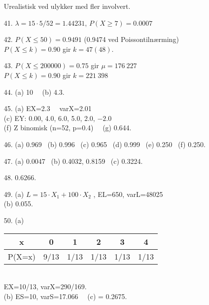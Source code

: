 \begin{itemize}
            Urealistisk ved ulykker med fler involvert. 
\item[41.]  $\lambda = 15\cdot 5/52=1.44231$, $P(X\geq 7)=0.0007$
\item[42.]  $P(X\leq 50)=0.9491$ (0.9474 ved Poissontilnærming)\\
            $P(X\leq k)=0.90$ gir $k=47(48)$.
\item[43.]  $P(X\leq 200000)=0.75$ gir $\mu=176\ 227$ \\
            $P(X\leq k)=0.90$ gir $k=221\ 398$
\item[44.]  (a) 10  \ \  (b) 4.3.
\item[45.]  (a) EX=2.3 \ \ varX=2.01\\
              (c) EY: 0.00, 4.0, 6.0, 5.0, 2.0, $-2.0$\\
              (f) Z binomisk (n=52, p=0.4) \ \  (g) 0.644.
\item[46.]  (a) 0.969 \  (b) 0.996 \ (c) 0.965  \ (d) 0.999
             \ (e) 0.250 \ (f) 0.250.
\item[47.]  (a) 0.0047 \  (b) 0.4032, 0.8159 \  (c) 0.3224.
\item[48.]  0.6266.
\item[49.]  (a) $L=15\cdot X_1 +100\cdot X_2$ , EL=650,  varL=48025 \\
            (b) 0.055.
\item[50.] (a) \begin{tabular}{c|ccccc}
                     x   &   0  &   1 &  2   &  3  &   4 \\ \hline   
                  P(X=x) &  9/13 & 1/13  & 1/13  & 1/13 &  1/13              
               \end{tabular}\\
              EX=10/13, varX=290/169.\\
              (b) ES=10,  varS=17.066  \ \ (c) = 0.2675.
\end{itemize}

